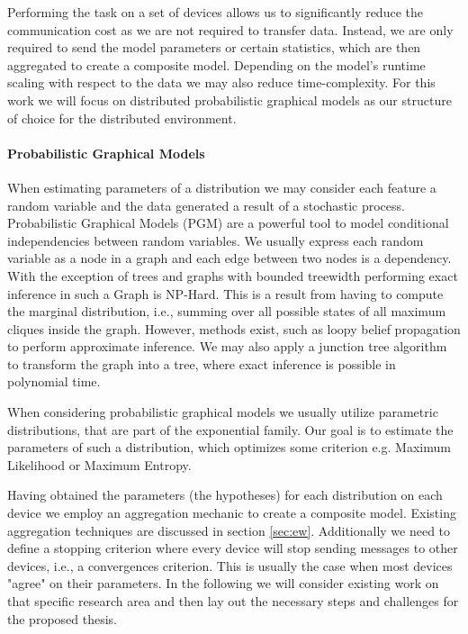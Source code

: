   Performing the task on a set of devices allows us to significantly reduce the communication cost as we are not required to transfer data.
  Instead, we are only required to send the model parameters or certain statistics, which are then aggregated to create a composite model.
  Depending on the model's runtime scaling with respect to the data we may also reduce time-complexity.
  For this work we will focus on distributed probabilistic graphical models as our structure of choice for the distributed environment.
  \paragraph{Probabilistic Graphical Models}  


  When estimating parameters of a distribution we may consider each feature a random variable and the data generated a result of a stochastic process.
  Probabilistic Graphical Models (PGM) are a powerful tool to model conditional independencies between random variables. 
  We usually express each random variable as a node in a graph and each edge between two nodes is a dependency. 
  With the exception of trees and graphs with bounded treewidth performing exact inference in such a Graph is NP-Hard.
  This is a result from having to compute the marginal distribution, i.e., summing over all possible states of all maximum cliques inside the graph.
  However, methods exist, such as loopy belief propagation to perform approximate inference.
  We may also apply a junction tree algorithm to transform the graph into a tree, where exact inference is possible in polynomial time.
    
  When considering probabilistic graphical models we usually utilize parametric distributions, that are part of the exponential family. 
  Our goal is to estimate the parameters of such a distribution, which optimizes some criterion e.g. Maximum Likelihood or Maximum Entropy.
  

  Having obtained the parameters (the hypotheses) for each distribution on each device we employ an aggregation mechanic to create a composite model.
  Existing aggregation techniques are discussed in section \ref{sec:ew}.
  Additionally we need to define a stopping criterion where every device will stop sending messages to other devices, i.e., a convergences criterion.
  This is usually the case when most devices "agree" on their parameters.
  In the following we will consider existing work on that specific research area and then lay out the necessary steps and challenges for the proposed thesis.

